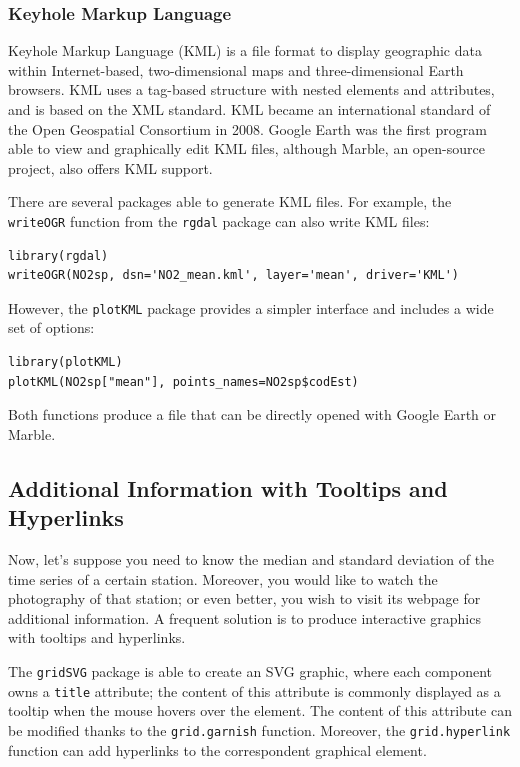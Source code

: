 \subsubsection{Keyhole Markup Language}
\label{sec-1-6-2}

Keyhole Markup Language (KML) is a file format to display geographic
data within Internet-based, two-dimensional maps and three-dimensional
Earth browsers. KML uses a tag-based structure with nested elements
and attributes, and is based on the XML standard. KML became an
international standard of the Open Geospatial Consortium
in 2008. Google Earth was the first program able to view and
graphically edit KML files, although Marble, an open-source project,
also offers KML support.


There are several packages able to generate KML files. For example,
the \texttt{writeOGR} function from the \texttt{rgdal} package can also write KML
files:
\lstset{language=R,numbers=none}
\begin{lstlisting}
library(rgdal)
writeOGR(NO2sp, dsn='NO2_mean.kml', layer='mean', driver='KML')
\end{lstlisting}

However, the \texttt{plotKML} package provides a simpler interface and
includes a wide set of options:
\lstset{language=R,numbers=none}
\begin{lstlisting}
library(plotKML)
plotKML(NO2sp["mean"], points_names=NO2sp$codEst)
\end{lstlisting}

Both functions produce a file that can be directly opened with Google
Earth or Marble.
\subsection{\floweroneleft Additional Information with Tooltips and Hyperlinks}
\label{sec-1-7}
Now, let's suppose you need to know the median and standard deviation
of the time series of a certain station. Moreover, you would like to
watch the photography of that station; or even better, you wish to visit
its webpage for additional information. A frequent solution is to
produce interactive graphics with tooltips and hyperlinks.

The \texttt{gridSVG} package is able to create an SVG graphic, where each
component owns a \texttt{title} attribute; the content of this attribute is
commonly displayed as a tooltip when the mouse hovers over the
element. The content of this attribute can be modified thanks to the
\texttt{grid.garnish} function. Moreover, the \texttt{grid.hyperlink} function can
add hyperlinks to the correspondent graphical element.

